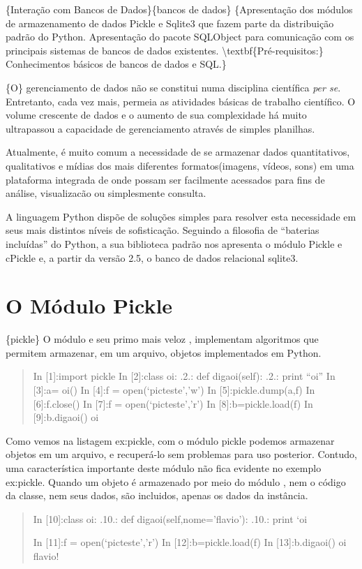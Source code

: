 \documentclass[a4paper,10pt,brazil]{sphinxmanual}
\begin{document}
\{Interação com Bancos de Dados\}\{bancos de dados\}
\{Apresentação dos módulos de armazenamento de dados Pickle e Sqlite3 que fazem parte da distribuição padrão do Python. Apresentação do pacote SQLObject para comunicação com os principais sistemas de bancos de dados existentes. \textbackslash{}textbf\{Pré-requisitos:\} Conhecimentos básicos de bancos de dados e SQL.\}

\{O\} gerenciamento de dados não se constitui numa disciplina
científica \emph{per se}. Entretanto, cada vez mais, permeia as
atividades básicas de trabalho científico. O volume crescente de
dados e o aumento de sua complexidade há muito ultrapassou a
capacidade de gerenciamento através de simples planilhas.

Atualmente, é muito comum a necessidade de se armazenar dados
quantitativos, qualitativos e mídias dos mais diferentes
formatos(imagens, vídeos, sons) em uma plataforma integrada de onde
possam ser facilmente acessados para fins de análise, visualizacão
ou simplesmente consulta.

A linguagem Python dispõe de soluções simples para resolver esta
necessidade em seus mais distintos níveis de sofisticação. Seguindo
a filosofia de ``baterias incluídas'' do Python, a sua biblioteca
padrão nos apresenta o módulo Pickle e cPickle e, a partir da
versão 2.5, o banco de dados relacional sqlite3.


\chapter{O Módulo Pickle}
\label{capbd:o-modulo-pickle}\label{capbd::doc}
\{pickle\} O módulo  e seu primo mais veloz ,
implementam algoritmos que permitem armazenar, em um arquivo,
objetos implementados em Python.
\begin{quote}

In {[}1{]}:import pickle In {[}2{]}:class oi: .2.: def digaoi(self): .2.:
print ``oi'' In {[}3{]}:a= oi() In {[}4{]}:f = open(`picteste','w') In
{[}5{]}:pickle.dump(a,f) In {[}6{]}:f.close() In {[}7{]}:f =
open(`picteste','r') In {[}8{]}:b=pickle.load(f) In {[}9{]}:b.digaoi() oi
\end{quote}

Como vemos na listagem ex:pickle, com o módulo pickle podemos
armazenar objetos em um arquivo, e recuperá-lo sem problemas para
uso posterior. Contudo, uma característica importante deste módulo
não fica evidente no exemplo ex:pickle. Quando um objeto é
armazenado por meio do módulo , nem o código da classe,
nem seus dados, são incluidos, apenas os dados da instância.
\begin{quote}

In {[}10{]}:class oi: .10.: def digaoi(self,nome='flavio'): .10.: print
`oi

In {[}11{]}:f = open(`picteste','r') In {[}12{]}:b=pickle.load(f) In
{[}13{]}:b.digaoi() oi flavio!
\end{quote}
\end{document}
